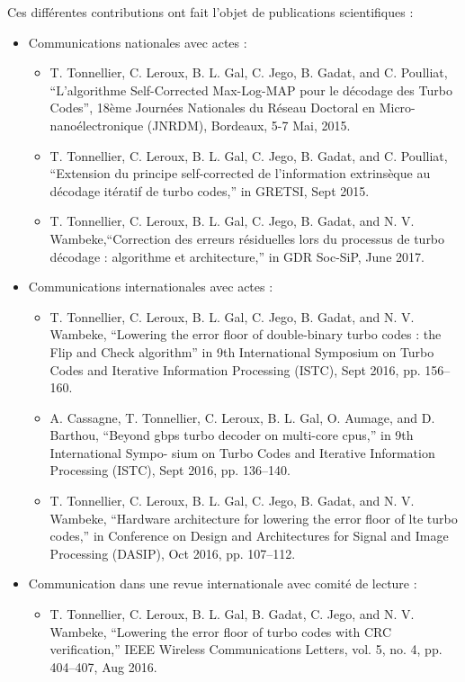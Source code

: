 Ces différentes contributions ont fait l'objet de publications scientifiques : \\
\begin{itemize}
	\item Communications nationales avec actes :
	\begin{itemize}
     	\item T. Tonnellier, C. Leroux, B. L. Gal, C. Jego, B. Gadat, and C. Poulliat,
		“L’algorithme Self-Corrected Max-Log-MAP pour le décodage des Turbo Codes”,
		18ème Journées Nationales du Réseau Doctoral en Micro-nanoélectronique (JNRDM), Bordeaux, 5-7 Mai, 2015.
		\item T. Tonnellier, C. Leroux, B. L. Gal, C. Jego, B. Gadat, and C. Poulliat, “Extension
		du principe self-corrected de l’information extrinsèque au décodage itératif de turbo
		codes,” in GRETSI, Sept 2015.
		\item T. Tonnellier, C. Leroux, B. L. Gal, C. Jego, B. Gadat, and N. V. Wambeke,“Correction 
		des erreurs résiduelles lors du processus de turbo décodage : algorithme et architecture,”
		in GDR Soc-SiP, June 2017.\\
	\end{itemize}
	\item Communications internationales avec actes :
	\begin{itemize}
		\item T. Tonnellier, C. Leroux, B. L. Gal, C. Jego, B. Gadat, and N. V. Wambeke,
		“Lowering the error floor of double-binary turbo codes : the Flip and Check algorithm”
		in 9th International Symposium on Turbo Codes and Iterative Information
		Processing (ISTC), Sept 2016, pp. 156–160.
		\item A. Cassagne, T. Tonnellier, C. Leroux, B. L. Gal, O. Aumage, and D. Barthou,
		“Beyond gbps turbo decoder on multi-core cpus,” in 9th International Sympo-
		sium on Turbo Codes and Iterative Information Processing (ISTC), Sept 2016, pp. 136–140.
		\item T. Tonnellier, C. Leroux, B. L. Gal, C. Jego, B. Gadat, and N. V. Wambeke,
		“Hardware architecture for lowering the error floor of lte turbo codes,” in 
		Conference on Design and Architectures for Signal and Image Processing (DASIP),
		Oct 2016, pp. 107–112.\\
	\end{itemize}
	\item Communication dans une revue internationale avec comité de lecture :
	\begin{itemize}
		\item T. Tonnellier, C. Leroux, B. L. Gal, B. Gadat, C. Jego, and N. V. Wambeke,
		“Lowering the error floor of turbo codes with CRC verification,” IEEE Wireless
		Communications Letters, vol. 5, no. 4, pp. 404–407, Aug 2016.
	\end{itemize}
\end{itemize}


